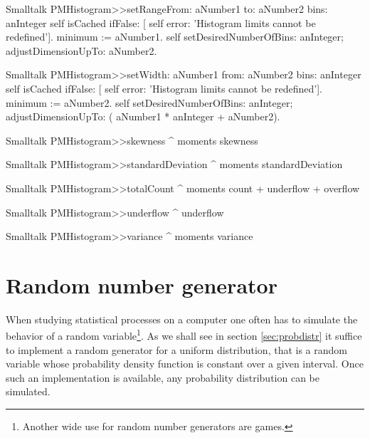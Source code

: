 \begin{displaycode}{Smalltalk}
PMHistogram>>setRangeFrom: aNumber1 to: aNumber2 bins: anInteger
    self isCached
        ifFalse: [ self error: 'Histogram limits cannot be 
                                                          redefined'].
    minimum := aNumber1.
    self setDesiredNumberOfBins: anInteger;
           adjustDimensionUpTo: aNumber2.
\end{displaycode}
         
\begin{displaycode}{Smalltalk}
PMHistogram>>setWidth: aNumber1 from: aNumber2 bins: anInteger
    self isCached
        ifFalse: [ self error: 'Histogram limits cannot be 
                                                          redefined'].
    minimum := aNumber2.
    self setDesiredNumberOfBins: anInteger;
           adjustDimensionUpTo: ( aNumber1 * anInteger + aNumber2).
\end{displaycode}
           
\begin{displaycode}{Smalltalk}
PMHistogram>>skewness
    ^ moments skewness
\end{displaycode}
  
\begin{displaycode}{Smalltalk}
PMHistogram>>standardDeviation
    ^ moments standardDeviation
\end{displaycode}
    
\begin{displaycode}{Smalltalk}
PMHistogram>>totalCount
    ^ moments count + underflow + overflow
\end{displaycode}
  
\begin{displaycode}{Smalltalk}
PMHistogram>>underflow
    ^ underflow
\end{displaycode}
  
\begin{displaycode}{Smalltalk}
PMHistogram>>variance
    ^ moments variance
\end{displaycode}
  
\section{Random number generator}
\label{sec:random} When studying statistical processes on a
computer one often has to simulate the behavior of a random
variable\footnote{Another wide use for random number generators
are games.}. As we shall see in section \ref{sec:probdistr} it
suffice to implement a random generator for a uniform
distribution, that is a random variable whose probability density
function is constant over a given interval. Once such an
implementation is available, any probability distribution can be
simulated.

